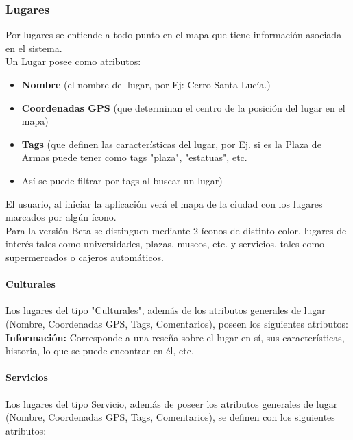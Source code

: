 \documentclass[10pt,letterpaper]{article}
\begin{document}
\subsubsection{Lugares}

Por lugares se entiende a todo punto en el mapa que tiene información asociada en el sistema.\\

Un Lugar posee como atributos:\\

\begin{itemize}
 \item \textbf{Nombre} (el nombre del lugar, por Ej: Cerro Santa Lucía.)
 \item \textbf{Coordenadas GPS} (que determinan el centro de la posición del lugar en el mapa)
 \item \textbf{Tags} (que definen las características del lugar, por Ej. si es la Plaza de Armas puede tener como tags "plaza", "estatuas", etc.  \item Así se puede filtrar por tags al buscar un lugar)
\end{itemize}

El usuario, al iniciar la aplicación verá el mapa de la ciudad con los lugares marcados por algún ícono.\\

Para la versión Beta se distinguen mediante 2 íconos de distinto color, lugares de interés tales como universidades, plazas, museos, etc. y servicios, tales como supermercados o cajeros automáticos.

\paragraph{Culturales}

Los lugares del tipo "Culturales", además de los atributos generales de lugar (Nombre, Coordenadas GPS, Tags, Comentarios), poseen los siguientes atributos:\\

\textbf{Información:} Corresponde a una reseña sobre el lugar en sí, sus características, historia, lo que se puede encontrar en él, etc.\\

\paragraph{Servicios}

Los lugares del tipo Servicio, además de poseer los atributos generales de lugar (Nombre, Coordenadas GPS, Tags, Comentarios), se definen con los siguientes atributos:\\
\end{document}
